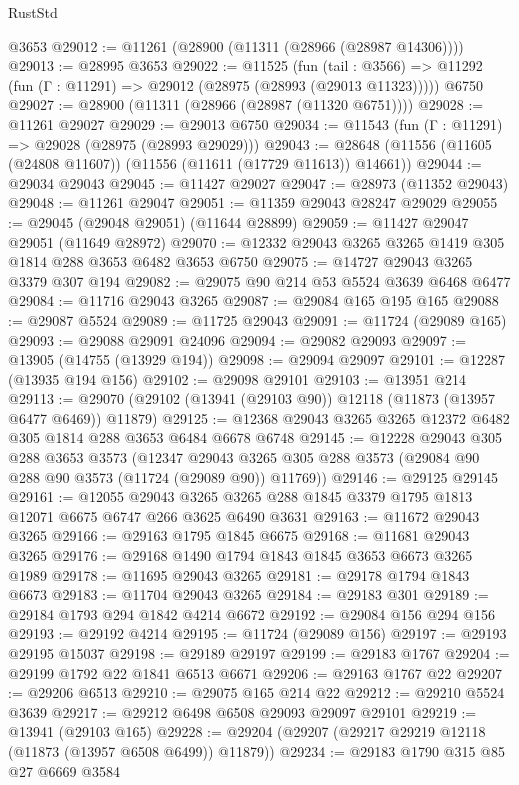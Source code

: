 \begin{lexlean}{RustStd}
\begin{coremodule}
    @3653
@29012 := @11261 (@28900 (@11311 (@28966 (@28987 @14306))))
@29013 := @28995 @3653
@29022 := @11525
    (fun (tail : @3566) => @11292 (fun (Γ : @11291) => @29012 (@28975 (@28993 (@29013 @11323)))))
    @6750
@29027 := @28900 (@11311 (@28966 (@28987 (@11320 @6751))))
@29028 := @11261 @29027
@29029 := @29013 @6750
@29034 := @11543 (fun (Γ : @11291) => @29028 (@28975 (@28993 @29029)))
@29043 := @28648 (@11556 (@11605 (@24808 @11607)) (@11556 (@11611 (@17729 @11613)) @14661))
@29044 := @29034 @29043
@29045 := @11427 @29027
@29047 := @28973 (@11352 @29043)
@29048 := @11261 @29047
@29051 := @11359 @29043 @28247 @29029
@29055 := @29045 (@29048 @29051) (@11644 @28899)
@29059 := @11427 @29047 @29051 (@11649 @28972)
@29070 := @12332 @29043 @3265 @3265 @1419 @305 @1814 @288 @3653 @6482 @3653 @6750
@29075 := @14727 @29043 @3265 @3379 @307 @194
@29082 := @29075 @90 @214 @53 @5524 @3639 @6468 @6477
@29084 := @11716 @29043 @3265
@29087 := @29084 @165 @195 @165
@29088 := @29087 @5524
@29089 := @11725 @29043
@29091 := @11724 (@29089 @165)
@29093 := @29088 @29091 @24096
@29094 := @29082 @29093
@29097 := @13905 (@14755 (@13929 @194))
@29098 := @29094 @29097
@29101 := @12287 (@13935 @194 @156)
@29102 := @29098 @29101
@29103 := @13951 @214
@29113 := @29070 (@29102 (@13941 (@29103 @90)) @12118 (@11873 (@13957 @6477 @6469)) @11879)
@29125 := @12368 @29043 @3265 @3265 @12372 @6482 @305 @1814 @288 @3653 @6484 @6678 @6748
@29145 := @12228
    @29043
    @305
    @288
    @3653
    @3573
    (@12347 @29043 @3265 @305 @288 @3573 (@29084 @90 @288 @90 @3573 (@11724 (@29089 @90)) @11769))
@29146 := @29125 @29145
@29161 := @12055
    @29043
    @3265
    @3265
    @288
    @1845
    @3379
    @1795
    @1813
    @12071
    @6675
    @6747
    @266
    @3625
    @6490
    @3631
@29163 := @11672 @29043 @3265
@29166 := @29163 @1795 @1845 @6675
@29168 := @11681 @29043 @3265
@29176 := @29168 @1490 @1794 @1843 @1845 @3653 @6673 @3265 @1989
@29178 := @11695 @29043 @3265
@29181 := @29178 @1794 @1843 @6673
@29183 := @11704 @29043 @3265
@29184 := @29183 @301
@29189 := @29184 @1793 @294 @1842 @4214 @6672
@29192 := @29084 @156 @294 @156
@29193 := @29192 @4214
@29195 := @11724 (@29089 @156)
@29197 := @29193 @29195 @15037
@29198 := @29189 @29197
@29199 := @29183 @1767
@29204 := @29199 @1792 @22 @1841 @6513 @6671
@29206 := @29163 @1767 @22
@29207 := @29206 @6513
@29210 := @29075 @165 @214 @22
@29212 := @29210 @5524 @3639
@29217 := @29212 @6498 @6508 @29093 @29097 @29101
@29219 := @13941 (@29103 @165)
@29228 := @29204 (@29207 (@29217 @29219 @12118 (@11873 (@13957 @6508 @6499)) @11879))
@29234 := @29183 @1790 @315 @85 @27 @6669 @3584

\end{coremodule}
\end{lexlean}
